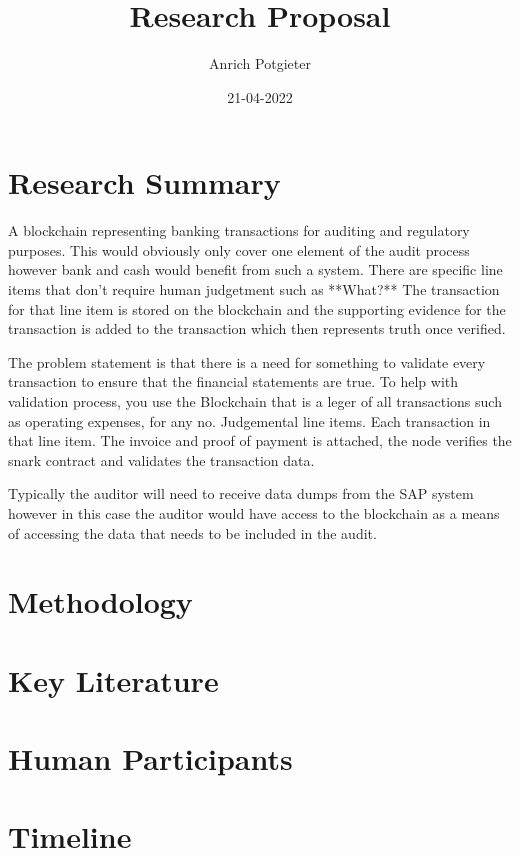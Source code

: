 \documentclass[12pt]{article}
\title{Research Proposal}
\author{Anrich Potgieter}
\date{21-04-2022}
\begin{document}
\maketitle
\tableofcontents

\section{Research Summary}
A blockchain representing banking transactions for auditing and regulatory purposes.
This would obviously only cover one element of the audit process however bank and cash would benefit from such a system.
There are specific line items that don't require human judgetment such as **What?** The transaction for that line item is stored on the blockchain and the supporting evidence for the transaction is added to the transaction which then represents truth once verified.

The problem statement is that there is a need for something to validate every transaction to ensure that the financial statements are true. To help with validation process, you use the Blockchain that is a leger of all transactions such as operating expenses, for any no. Judgemental line items. Each transaction in that line item. The invoice and proof of payment is attached, the node verifies the snark contract and validates the transaction data.

Typically the auditor will need to receive data dumps from the SAP system however in this case the auditor would have access to the blockchain as a means of accessing the data that needs to be included in the audit.
\section{Methodology}

\section{Key Literature}

\section{Human Participants}

\section{Timeline}
\end{document}

